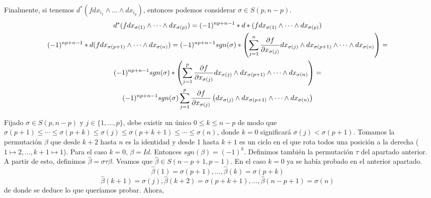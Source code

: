 \documentclass[twoside]{article}
\begin{document}
\begin{solucion}
Finalmente, si tenemos $d^*(fdx_{i_1}\land\dots\land dx_{i_p})$, entonces podemos considerar $\sigma\in S(p,n-p)$.
\begin{gather*}
d^*(fdx_{\sigma(1)}\land\dots\land dx_{\sigma(p)})=(-1)^{np+n-1}*d*(f dx_{\sigma(1)}\land\dots\land dx_{\sigma(p)})\\
(-1)^{np+n-1}*d(fdx_{\sigma(p+1)}\land\dots\land dx_{\sigma(n)})=(-1)^{np+n-1}sgn(\sigma)*\left(\sum_{j=1}^n\frac{\partial f}{\partial x_{\sigma(j)}}dx_{\sigma(j)}\land dx_{\sigma(p+1)}\land\dots\land dx_{\sigma(n)}\right)=\\
(-1)^{np+n-1}sgn(\sigma)*\left(\sum_{j=1}^p\frac{\partial f}{\partial x_{\sigma(j)}}dx_{\sigma(j)}\land dx_{\sigma(p+1)}\land\dots\land dx_{\sigma(n)}\right)=\\
(-1)^{np+n-1}sgn(\sigma)\sum_{j=1}^p\frac{\partial f}{\partial x_{\sigma(j)}}\left(dx_{\sigma(j)}\land dx_{\sigma(p+1)}\land\dots\land dx_{\sigma(n)}\right)
\end{gather*}

Fijado $\sigma\in S(p,n-p)$ y $j\in\{1,\dots, p\}$, debe existir un único $0\leq k\leq n-p$ de modo que $\sigma(p+1)\leq\cdots\leq\sigma(p+k)\leq\sigma(j)\leq\sigma(p+k+1)\leq\cdots\leq\sigma(n)$, donde $k=0$ significará $\sigma(j)<\sigma(p+1)$. Tomamos la permutación $\beta$ que desde $k+2$ hasta $n$ es la identidad y desde 1 hasta $k+1$ es un ciclo en el que rota todos una posición a la derecha ($1\mapsto 2,\dots, k+1\mapsto 1$). Para el caso $k=0$, $\beta=Id$. Entonces $sgn(\beta)=(-1)^k$. Definimos también la permutación $\tau$ del apartado anterior. A partir de esto, definimos $\hat{\beta}=\sigma\tau
\beta$. Veamos que $\hat{\beta}\in S(n-p+1,p-1)$. En el caso $k=0$ ya se había probado en el anterior apartado.
\[
\hat{\beta}(1)=\sigma(p+1),\dots, \hat{\beta}(k)=\sigma(p+k)
\]
\[
\hat{\beta}(k+1)=\sigma(j),\hat{\beta}(k+2)=\sigma(p+k+1),\dots,\hat{\beta}(n-p+1)=\sigma(n) 
\]
de donde se deduce lo que queríamos probar. Ahora, 


\end{solucion}
\end{document}

